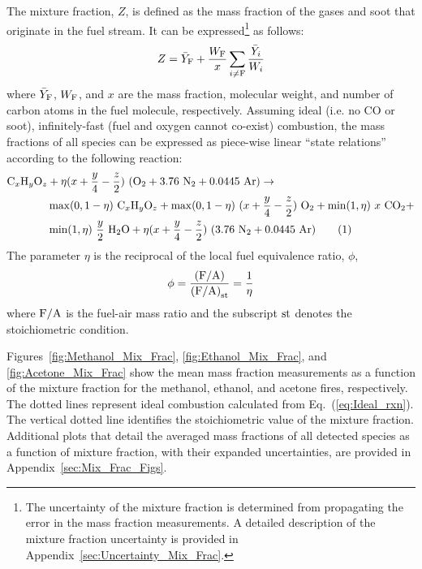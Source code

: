\documentclass[12pt]{article}
\newcommand\numberthis{\addtocounter{equation}{1}\tag{\theequation}}
\begin{document}
The mixture fraction, $Z$, is defined as the mass fraction of the gases and soot that originate in the fuel stream. It can be expressed\footnote{The uncertainty of the mixture fraction is determined from propagating the error in the mass fraction measurements. A detailed description of the mixture fraction uncertainty is provided in Appendix~\ref{sec:Uncertainty_Mix_Frac}.} as follows:
\begin{equation}\label{eq:Mixture_Fraction}
  Z = \bar{Y}_{\rm F} + \frac{W_{\rm F}}{x} \sum_{i\ne {\rm F}} \frac{\bar{Y}_i}{W_{i}}
\end{equation}
where $\bar{Y}_{\rm F}$, ${W_{\rm F}}$, and $x$ are the mass fraction, molecular weight, and number of carbon atoms in the fuel molecule, respectively. Assuming ideal (i.e. no CO or soot), infinitely-fast (fuel and oxygen cannot co-exist) combustion, the mass fractions of all species can be expressed as piece-wise linear ``state relations'' according to the following reaction:
\begin{align*}
{\rm C}_{x}{\rm H}_{y}{\rm O}_{z} & +\eta(x+\frac{y}{4}-\frac{z}{2})~({\rm O}_{2}+3.76~{\rm N}_{2}+0.0445~{\rm Ar}) \rightarrow  \\
          & \max(0,1-\eta)~{\rm C}_{x}{\rm H}_{y}{\rm O}_{z}+\max(0,1-\eta)~(x+\frac{y}{4}-\frac{z}{2})~{\rm O}_{2}+ \min(1,\eta)~x~{\rm CO}_{2} +  \\
          & \min(1,\eta)~\frac{y}{2}~{\rm H}_{2}{\rm O}+\eta(x+\frac{y}{4}-\frac{z}{2})~(3.76~{\rm N}_{2}+0.0445~{\rm Ar})  \numberthis \label{eq:Ideal_rxn}
\end{align*}
The parameter $\eta$ is the reciprocal of the local fuel equivalence ratio, $\phi$,
\begin{equation}\label{eq:Eta}
\phi=\frac{\rm (F/A)}{{\rm (F/A)}_{\rm st}}=\frac{1}{\eta}
\end{equation}
where $\rm F/A$ is the fuel-air mass ratio and the subscript $\rm st$ denotes the stoichiometric condition.

Figures~\ref{fig:Methanol_Mix_Frac}, \ref{fig:Ethanol_Mix_Frac}, and \ref{fig:Acetone_Mix_Frac} show the mean mass fraction measurements as a function of the mixture fraction for the methanol, ethanol, and acetone fires, respectively. The dotted lines represent ideal combustion calculated from Eq.~(\ref{eq:Ideal_rxn}). The vertical dotted line identifies the stoichiometric value of the mixture fraction. Additional plots that detail the averaged mass fractions of all detected species as a function of mixture fraction, with their expanded uncertainties, are provided in Appendix~\ref{sec:Mix_Frac_Figs}.
\end{document}
